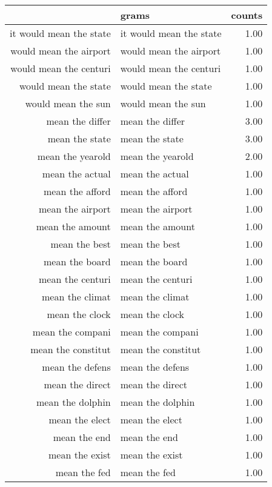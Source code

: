 \begin{table}[ht]
\centering
\begin{tabular}{rlr}
  \hline
 & grams & counts \\ 
  \hline
it would mean the state & it would mean the state & 1.00 \\ 
  would mean the airport & would mean the airport & 1.00 \\ 
  would mean the centuri & would mean the centuri & 1.00 \\ 
  would mean the state & would mean the state & 1.00 \\ 
  would mean the sun & would mean the sun & 1.00 \\ 
  mean the differ & mean the differ & 3.00 \\ 
  mean the state & mean the state & 3.00 \\ 
  mean the yearold & mean the yearold & 2.00 \\ 
  mean the actual & mean the actual & 1.00 \\ 
  mean the afford & mean the afford & 1.00 \\ 
  mean the airport & mean the airport & 1.00 \\ 
  mean the amount & mean the amount & 1.00 \\ 
  mean the best & mean the best & 1.00 \\ 
  mean the board & mean the board & 1.00 \\ 
  mean the centuri & mean the centuri & 1.00 \\ 
  mean the climat & mean the climat & 1.00 \\ 
  mean the clock & mean the clock & 1.00 \\ 
  mean the compani & mean the compani & 1.00 \\ 
  mean the constitut & mean the constitut & 1.00 \\ 
  mean the defens & mean the defens & 1.00 \\ 
  mean the direct & mean the direct & 1.00 \\ 
  mean the dolphin & mean the dolphin & 1.00 \\ 
  mean the elect & mean the elect & 1.00 \\ 
  mean the end & mean the end & 1.00 \\ 
  mean the exist & mean the exist & 1.00 \\ 
  mean the fed & mean the fed & 1.00 \\ 

\end{tabular}
\end{table}
